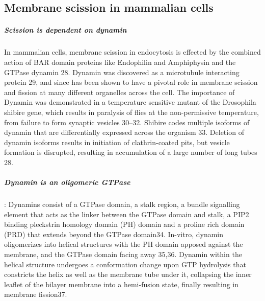 	\subsection{Membrane scission in mammalian cells}
		\subparagraph{Scission is dependent on dynamin} 
\vspace{2mm}
		 In mammalian cells, membrane scission in endocytosis is effected by the combined action of BAR domain proteins like Endophilin and Amphiphysin and the GTPase dynamin 28.  Dynamin was discovered as a microtubule interacting protein 29, and since has been shown to have a pivotal role in membrane scission and fission at many different organelles across the cell. The importance of Dynamin was demonstrated in a temperature sensitive mutant of the Drosophila shibire gene, which results in paralysis of flies at the non-permissive temperature, from failure to form synaptic vesicles 30–32. Shibire codes multiple isoforms of dynamin that are differentially expressed across the organism 33. Deletion of dynamin isoforms results in initiation of clathrin-coated pits, but vesicle formation is disrupted, resulting in accumulation of a large number of long tubes 28. \par 
\vspace{5mm}
		\subparagraph{Dynamin is an oligomeric GTPase}: 
Dynamins consist of a GTPase domain, a stalk region, a bundle signalling element that acts as the linker between the GTPase domain and stalk, a PIP2 binding pleckstrin homology domain (PH) domain and a proline rich domain (PRD) that extends beyond the GTPase domain34. In-vitro, dynamin oligomerizes into helical structures with the PH domain apposed against the membrane, and the GTPase domain facing away 35,36. Dynamin within the helical structure undergoes a conformation change upon GTP hydrolysis that constricts the helix as well as the membrane tube under it, collapsing the inner leaflet of the bilayer membrane into a hemi-fusion state, finally resulting in membrane fission37. \par 

